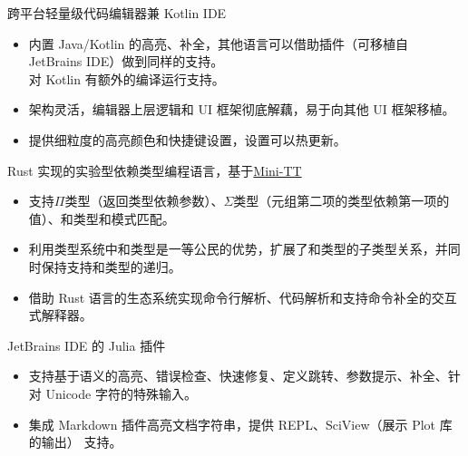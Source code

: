 \documentclass{resume}
\begin{document}
跨平台轻量级代码编辑器兼 Kotlin IDE
\begin{itemize}
  \item 内置 Java/Kotlin 的高亮、补全，其他语言可以借助插件（可移植自 JetBrains IDE）做到同样的支持。 \\
    对 Kotlin 有额外的编译运行支持。
  \item 架构灵活，编辑器上层逻辑和 UI 框架彻底解藕，易于向其他 UI 框架移植。
  \item 提供细粒度的高亮颜色和快捷键设置，设置可以热更新。
\end{itemize}

Rust 实现的实验型依赖类型编程语言，基于\href{http://www.cse.chalmers.se/~bengt/papers/GKminiTT.pdf} {Mini-TT}
\begin{itemize}
  \item 支持$\Pi$类型（返回类型依赖参数）、$\Sigma$类型（元组第二项的类型依赖第一项的值）、和类型和模式匹配。
  \item 利用类型系统中和类型是一等公民的优势，扩展了和类型的子类型关系，并同时保持支持和类型的递归。
  \item 借助 Rust 语言的生态系统实现命令行解析、代码解析和支持命令补全的交互式解释器。
\end{itemize}


JetBrains IDE 的 Julia 插件
\begin{itemize}
  \item 支持基于语义的高亮、错误检查、快速修复、定义跳转、参数提示、补全、针对 Unicode 字符的特殊输入。
  \item 集成 Markdown 插件高亮文档字符串，提供 REPL、SciView（展示 Plot 库的输出） 支持。
\end{itemize}
\end{document}
